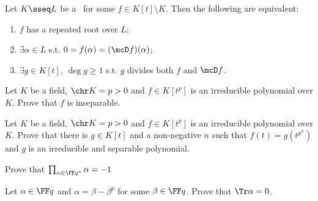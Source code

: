 \documentclass{article}
\begin{document}
\setcounter{section}{8} %
\begin{exercise}
  Let \( K\sseq L \) be a \sfe~for some \( f\in K[t]\setminus K \).
  Then the following are equivalent: \begin{enumerate}[label=(\roman*)]
    \item \( f \) has a repeated root over \( L \);
    \item \( \exists \alpha\in L \) s.t. \( 0=f(\alpha)=(\mcD f)(\alpha) \);
    \item \( \exists g\in K[t] \), \( \deg g \geq 1 \) s.t. \( g \) divides both \( f \) and \( \mcD f \).
  \end{enumerate}
\end{exercise}
\begin{solution}
\end{solution}
\pagebreak

\begin{exercise}
Let \( K \) be a field, \( \chr K = p > 0 \) and \( f\in K[t^p] \) is an irreducible polynomial over \( K \).
Prove that \( f \) is inseparable.
\end{exercise}
\begin{solution}

\end{solution}
\pagebreak

\begin{exercise}
Let \( K \) be a field, \( \chr K = p > 0 \) and \( f\in K[t^p] \) is an irreducible polynomial over \( K \).
Prove that there is \( g\in K[t] \) and a non-negative \( n \) such that \( f(t)=g\left(t^{p^n}\right) \) and \( g \) is  an irreducible and separable polynomial.
\end{exercise}
\begin{solution}

\end{solution}
\pagebreak

\begin{exercise}
  Prove that \( \prod_{\alpha\in \FF q^*} \alpha = -1 \)
\end{exercise}
\begin{solution}

\end{solution}
\pagebreak

\begin{subexercise}
  Let \( \alpha\in\FF q \) and \( \alpha=\beta-\beta^p \) for some \( \beta\in\FF q \).
  Prove that \( \Tr \alpha = 0 \).
\end{subexercise}
\begin{solution}

\end{solution}
\pagebreak
\end{document}
